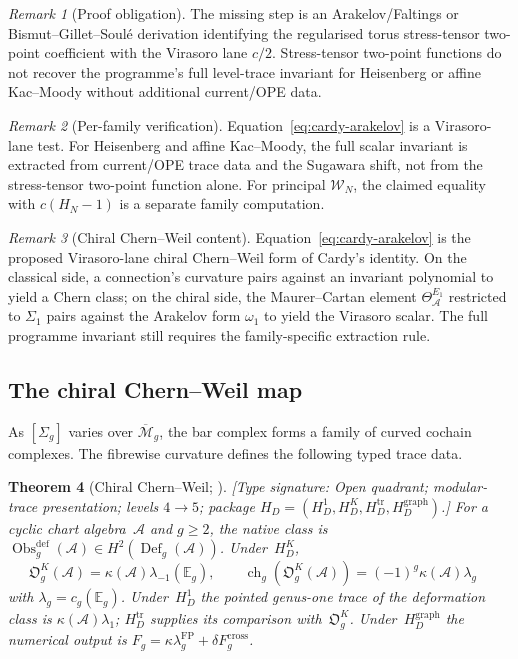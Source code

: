 \documentclass[11pt,reqno]{amsart}
\newtheorem{theorem}{Theorem}[section]
\theoremstyle{definition}
\theoremstyle{remark}
\newtheorem{remark}[theorem]{Remark}
\newcommand{\cA}{\mathcal{A}}
\newcommand{\cW}{\mathcal{W}}
\newcommand{\Mbar}{\overline{\mathcal{M}}}
\newcommand{\Eone}{E_1}
\numberwithin{equation}{section}
\begin{document}
\begin{remark}[Proof obligation]
The missing step is an Arakelov/Faltings or Bismut--Gillet--Soulé
derivation identifying the regularised torus stress-tensor two-point
coefficient with the Virasoro lane $c/2$. Stress-tensor two-point
functions do not recover the programme's full level-trace invariant
for Heisenberg or affine Kac--Moody without additional current/OPE
data.
\end{remark}

\begin{remark}[Per-family verification]
\label{rem:cardy-arakelov-families}
Equation~\eqref{eq:cardy-arakelov} is a Virasoro-lane test. For
Heisenberg and affine Kac--Moody, the full scalar invariant is
extracted from current/OPE trace data and the Sugawara shift, not from
the stress-tensor two-point function alone. For principal $\cW_N$, the
claimed equality with $c(H_N-1)$ is a separate family computation.
\end{remark}

\begin{remark}[Chiral Chern--Weil content]
\label{rem:cardy-is-chern-weil}
Equation~\eqref{eq:cardy-arakelov} is the proposed Virasoro-lane
chiral Chern--Weil form of Cardy's identity. On the classical side, a connection's
curvature pairs against an invariant polynomial to yield a
Chern class; on the chiral side, the Maurer--Cartan element
$\Theta^{\Eone}_\cA$ restricted to $\Sigma_1$ pairs against
the Arakelov form $\omega_1$ to yield the Virasoro scalar. The
full programme invariant still requires the family-specific
extraction rule.
\end{remark}

\subsection{The chiral Chern--Weil map}

As $[\Sigma_g]$ varies over $\Mbar_g$, the bar complex
forms a family of curved cochain complexes.  The fibrewise curvature
defines the following typed trace data.

\begin{theorem}[Chiral Chern--Weil; \ClaimStatusConditional]\label{thm:chiral-cw}
\textup{[Type signature: Open quadrant; modular-trace presentation;
levels $4\to5$; package
$H_D=(H_D^1,H_D^K,H_D^{\mathrm{tr}},H_D^{\mathrm{graph}})$.]}
For a cyclic chart algebra~$\cA$ and $g\geq2$, the native class is
$\operatorname{Obs}^{\mathrm{def}}_g(\cA)\in
H^2(\operatorname{Def}_g(\cA))$.  Under~$H_D^K$,
\begin{equation}\label{eq:obs-class}
\mathfrak O_g^K(\cA)=\kappa(\cA)\lambda_{-1}(\mathbb E_g),
\qquad
\operatorname{ch}_g(\mathfrak O_g^K(\cA))
=(-1)^g\kappa(\cA)\lambda_g
 \quad \end{equation}
with $\lambda_g=c_g(\mathbb E_g)$.  Under~$H_D^1$ the pointed
genus-one trace of the deformation class is $\kappa(\cA)\lambda_1$;
$H_D^{\mathrm{tr}}$ supplies its comparison with~$\mathfrak O_g^K$.
Under~$H_D^{\mathrm{graph}}$ the numerical output is
$F_g=\kappa\lambda_g^{\mathrm{FP}}+\delta F_g^{\mathrm{cross}}$.
\end{theorem}
\end{document}
